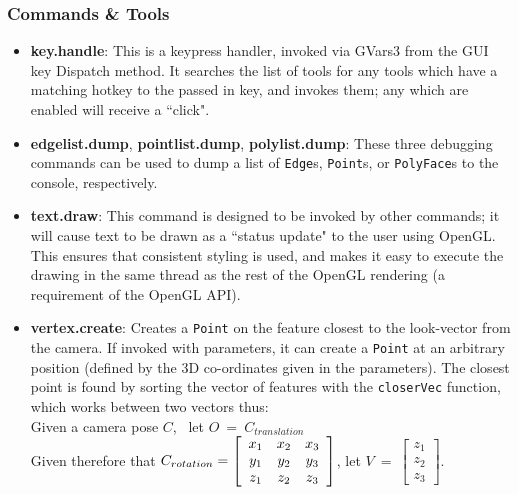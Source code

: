\documentclass[a4paper,10pt]{report}
\begin{document}
\begin{enumerate}
{}
\end{enumerate}

\subsubsection{Commands \& Tools}
\label{cmdTools}
\begin{itemize}
\item{\textbf{key.handle}: This is a keypress handler, invoked via GVars3 from the GUI key Dispatch method. It searches the list of tools for any tools which have a matching hotkey to the passed in key, and invokes them; any which are enabled will receive a ``click".}
\item{\textbf{edgelist.dump}, \textbf{pointlist.dump}, \textbf{polylist.dump}: These three debugging commands can be used to dump a list of \texttt{Edge}s, \texttt{Point}s, or \texttt{PolyFace}s to the console, respectively.}
\item{\textbf{text.draw}: This command is designed to be invoked by other commands; it will cause text to be drawn as a ``status update" to the user using OpenGL. This ensures that consistent styling is used, and makes it easy to execute the drawing in the same thread as the rest of the OpenGL rendering (a requirement of the OpenGL API).}
\item{\textbf{vertex.create}: Creates a \texttt{Point} on the feature closest to the look-vector from the camera. If invoked with parameters, it can create a \texttt{Point} at an arbitrary position (defined by the 3D co-ordinates given in the parameters). The closest point is found by sorting the vector of features with the \texttt{closerVec} function, which works between two vectors thus: 
\\

Given a camera pose $C$, ~let $O ~=~ C_{translation}$
\\

Given therefore that $C_{rotation} = \left[
  \begin{array}{c c c}
    x_1 & x_2 & x_3 \\
    y_1 & y_2 & y_3 \\
    z_1 & z_2 & z_3
  \end{array}\right]$, let $V ~=~ \left[ 
  \begin{array}{c}
    z_1 \\ 
    z_2 \\ 
    z_3 
  \end{array}\right]$.
\\ \\
  
}
\end{itemize}
\end{document}
